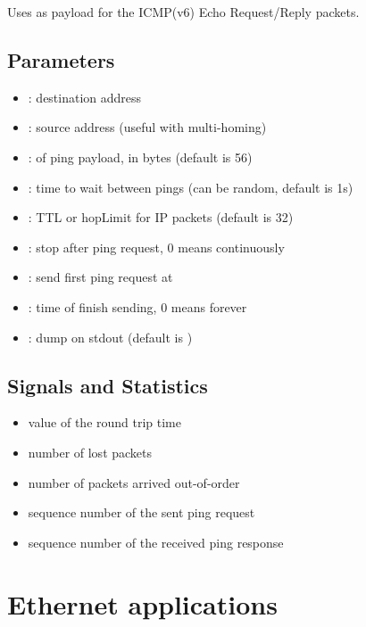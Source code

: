Uses  as payload for the ICMP(v6) Echo Request/Reply packets.

\subsection*{Parameters}

\begin{itemize}
  \item {}: destination address
  \item {}: source address (useful with multi-homing)
  \item {}: of ping payload, in bytes (default is 56)
  \item {}: time to wait between pings (can be random, default is 1s)
  \item {}: TTL or hopLimit for IP packets (default is 32)
  \item {}: stop after  ping request, 0 means continuously
  \item {}: send first ping request at 
  \item {}: time of finish sending, 0 means forever
  \item {}: dump on stdout (default is )
\end{itemize}

\subsection*{Signals and Statistics}

\begin{itemize}
  \item {} value of the round trip time
  \item {} number of lost packets
  \item {} number of packets arrived out-of-order
  \item {} sequence number of the sent ping request
  \item {} sequence number of the received ping response
\end{itemize}



\section{Ethernet applications}


